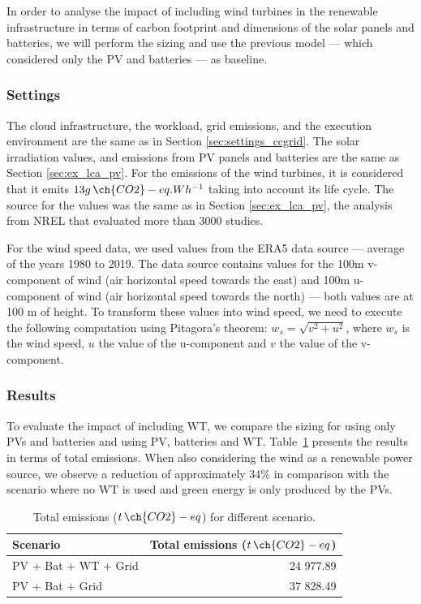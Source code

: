 In order to analyse the impact of including wind turbines in the renewable infrastructure in terms of carbon footprint and dimensions of the solar panels and batteries, we will perform the sizing and use the previous model --- which considered only the PV and batteries --- as baseline. 

\subsubsection{Settings}
\label{sec:settings_wt}

The cloud infrastructure, the workload, grid emissions, and the execution environment are the same as in Section \ref{sec:settings_ccgrid}. The solar irradiation values, and emissions from PV panels and batteries are the same as Section \ref{sec:ex_lca_pv}. For the  emissions of the wind turbines, it is considered that it emits $13 g\,\ch{CO2}-eq.Wh^{-1}$ taking into account its life cycle. The source for the values was the same as in Section \ref{sec:ex_lca_pv}, the analysis from NREL that evaluated more than 3000 studies.

For the wind speed data, we used values from the ERA5 data source \cite{era5_wind_2022} --- average of the years 1980 to 2019. The data source contains values for the 100m v-component of wind (air horizontal speed towards the east) and 100m u-component of wind (air horizontal speed towards the north) --- both values are at 100 m of height. To transform these values into wind speed, we need to execute the following computation using Pitagora's theorem: $ w_s = \sqrt{ v^2 + u^2} $, where $w_s$ is the wind speed, $u$ the value of the u-component and $v$ the value of the v-component.

\subsubsection{Results}
\label{sec:results_wt}

To evaluate the impact of including WT, we compare the sizing for using only PVs and batteries and using PV, batteries and WT. Table~\ref{tab:total_wind_and_pv_co2} presents the results in terms of total emissions. When also considering the wind as a renewable power source, we observe a reduction of approximately 34\% in comparison with the scenario where no WT is used and green energy is only produced by the PVs.

\begin{table}[h]  
  \caption{Total emissions ($t\,\ch{CO2}-eq$) for different scenario. }\label{tab:total_wind_and_pv_co2} \centering  
  \begin{tabular}{|l|r|}
  \hline    
  \textbf{Scenario} &   \textbf{Total emissions ($t\,\ch{CO2}-eq$)} \\
  \hline    
  PV + Bat + WT + Grid  & 24 977.89 \\    
  \hline
  PV + Bat + Grid       & 37 828.49 \\    
  \hline
\end{tabular}  
\end{table}


